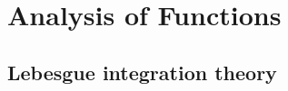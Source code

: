 \documentclass[main.tex]{subfiles}
\begin{document}
	\chapter{Analysis of Functions}	
	\section{Lebesgue integration theory}
	
\end{document}
